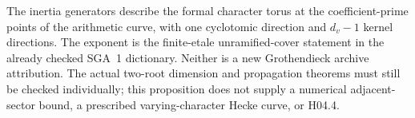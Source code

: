 The inertia generators describe the formal character torus at the
coefficient-prime points of the arithmetic curve, with one
cyclotomic direction and \(d_v-1\) kernel directions.
The exponent is the finite-etale unramified-cover statement in
the already checked SGA~1 dictionary.  Neither is a new
Grothendieck archive attribution.  The actual two-root dimension
and propagation theorems must still be checked individually;
this proposition does not supply a numerical adjacent-sector
bound, a prescribed varying-character Hecke curve, or H04.4.
